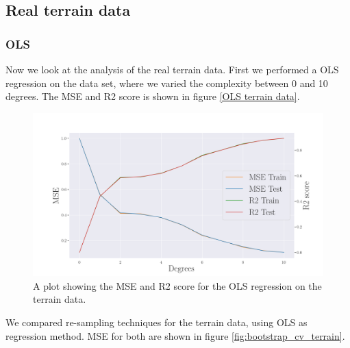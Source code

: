 \subsection{Real terrain data}
\subsubsection{OLS}
\noindent Now we look at the analysis of the real terrain data. First we performed a OLS regression on the data set, where we varied the complexity between 0 and 10 degrees. The MSE and R2 score is shown in figure \eqref{OLS terrain data}. 
\begin{figure}[H]
	\centering
	\includegraphics[width=\linewidth]{images/Figure_21.png}
	\caption{A plot showing the MSE and R2 score for the OLS regression on the terrain data.}
	\label{OLS terrain data}
\end{figure}
\noindent We compared re-sampling techniques for the terrain data, using OLS as regression method. MSE for both are shown in figure \ref{fig:bootstrap_cv_terrain}. 
